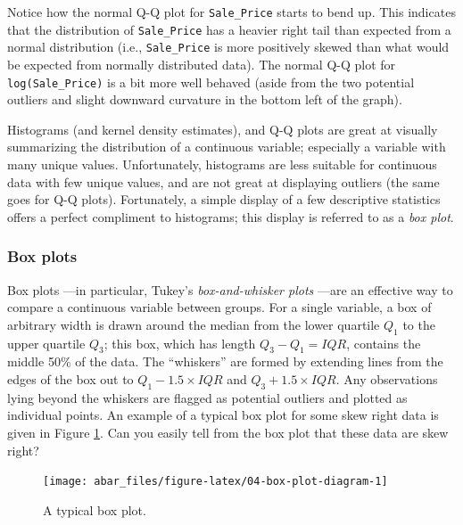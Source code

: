 \documentclass[]{book}
\theoremstyle{definition}
\theoremstyle{definition}
\theoremstyle{definition}
\theoremstyle{remark}
\begin{document}
Notice how the normal Q-Q plot for \texttt{Sale\_Price} starts to bend
up. This indicates that the distribution of \texttt{Sale\_Price} has a
heavier right tail than expected from a normal distribution (i.e.,
\texttt{Sale\_Price} is more positively skewed than what would be
expected from normally distributed data). The normal Q-Q plot for
\texttt{log(Sale\_Price)} is a bit more well behaved (aside from the two
potential outliers and slight downward curvature in the bottom left of
the graph).

Histograms (and kernel density estimates), and Q-Q plots are great at
visually summarizing the distribution of a continuous variable;
especially a variable with many unique values. Unfortunately, histograms
are less suitable for continuous data with few unique values, and are
not great at displaying outliers (the same goes for Q-Q plots).
Fortunately, a simple display of a few descriptive statistics offers a
perfect compliment to histograms; this display is referred to as a
\emph{box plot}.

\hypertarget{boxplots}{%
\subsubsection{Box plots}\label{boxplots}}

Box plots \citep{frigge-some-1989}---in particular, Tukey's
\emph{box-and-whisker plots} \citep{tukey-exploratory-1977}---are an
effective way to compare a continuous variable between groups. For a
single variable, a box of arbitrary width is drawn around the median
from the lower quartile \(Q_1\) to the upper quartile \(Q_3\); this box,
which has length \(Q_3 - Q_1 = IQR\), contains the middle 50\% of the
data. The ``whiskers'' are formed by extending lines from the edges of
the box out to \(Q_1 - 1.5 \times IQR\) and \(Q_3 + 1.5 \times IQR\).
Any observations lying beyond the whiskers are flagged as potential
outliers and plotted as individual points. An example of a typical box
plot for some skew right data is given in Figure
\ref{fig:04-box-plot-diagram}. Can you easily tell from the box plot
that these data are skew right? 🤔

\begin{figure}

{\centering \texttt{[image: abar\_files/figure-latex/04-box-plot-diagram-1]} 

}

\caption{A typical box plot.}\label{fig:04-box-plot-diagram}
\end{figure}
\end{document}
